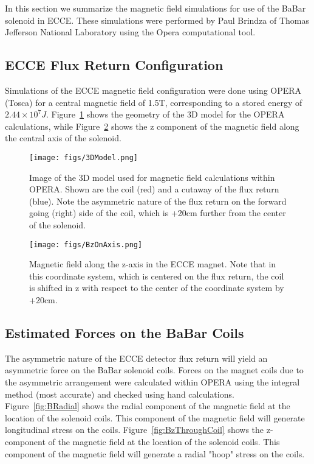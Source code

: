 In this section we summarize the magnetic field simulations for use of the BaBar solenoid in ECCE.  These simulations were performed by Paul Brindza of Thomas Jefferson National Laboratory using the Opera computational tool. 

\subsection{ECCE Flux Return Configuration}

Simulations of the ECCE magnetic field configuration were done using OPERA (Tosca) for a central magnetic field of 1.5T, corresponding to a stored energy of $2.44\times 10^{7} J$.  Figure~\ref{fig:3DModel} shows the geometry of the 3D model for the OPERA calculations, while Figure~\ref{fig:BzOnAxis} shows the z component of the magnetic field along the central axis of the solenoid. 

\begin{figure}[h!tbp]
    \centering
    \texttt{[image: figs/3DModel.png]}
    \caption{Image of the 3D model used for magnetic field calculations within OPERA. Shown are the coil (red) and a cutaway of the flux return (blue). Note the asymmetric nature of the flux return on the forward going (right) side of the coil, which is +20cm further from the center of the solenoid. }
    \label{fig:3DModel}
\end{figure}

\begin{figure}[h!tbp]
    \centering
    \texttt{[image: figs/BzOnAxis.png]}
    \caption{Magnetic field along the z-axis in the ECCE magnet.  Note that in this coordinate system, which is centered on the flux return, the coil is shifted in z with respect to the center of the coordinate system by +20cm.}
    \label{fig:BzOnAxis}
\end{figure}

\subsection{Estimated Forces on the BaBar Coils}

The asymmetric nature of the ECCE detector flux return will yield an asymmetric force on the BaBar solenoid coils. Forces on the magnet coils due to the asymmetric arrangement were calculated within OPERA using the integral method (most accurate) and checked using hand calculations. Figure~\ref{fig:BRadial} shows the radial component of the magnetic field at the location of the solenoid coils. This component of the magnetic field will generate longitudinal stress on the coils. Figure~\ref{fig:BzThroughCoil} shows the z-component of the magnetic field at the location of the solenoid coils. This component of the magnetic field will generate a radial "hoop" stress on the coils. 

